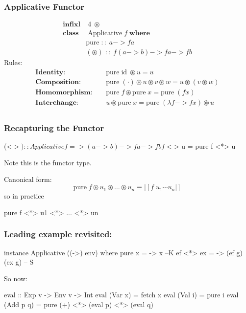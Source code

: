 \documentclass[18pt]{beamer}
\begin{document}
\begin{frame}[fragile] \frametitle{Applicative Functor}

\begin{align*}
  \mathbf{infixl} & \; 4 \; \circledast\\
  \mathbf{class} & \; \mathrm{Applicative} \; f \; \mathbf{where}\\
  \quad & \mathrm{pure} \; :: \; a -> f a\\
  \quad & (\circledast) \; :: \; f (a -> b) -> f a -> f b
\end{align*}
Rules:
\begin{align*}
  \mathbf{Identity:} \quad & \mathrm{pure} \; \mathrm{id} \;
  \circledast u = u\\
  \mathbf{Composition:} \quad & \mathrm{pure} \; (\cdot) \circledast u
  \circledast v \circledast w = u \circledast (v \circledast w)\\
  \mathbf{Homomorphism:} \quad & \mathrm{pure} \; f \circledast
  \mathrm{pure} \; x = \mathrm{pure} \; (f x)\\
  \mathbf{Interchange:} \quad & u \circledast \mathrm{pure} \; x = \mathrm{pure} \;
  (\lambda f -> f x) \circledast u\\
\end{align*}
\end{frame}

\begin{frame}[fragile] \frametitle{Recapturing the Functor}
  \begin{code}
    (<$>) :: Applicative f =>
          (a -> b) -> f a -> f b
    f <$> u = pure f <*> u
  \end{code}
  Note this is the functor type.
\end{frame}
\begin{frame}[fragile]
Canonical form:\\
\begin{equation*}
\mathrm{pure}\; f \circledast u_1 \circledast \ldots \circledast u_n \equiv |[f
\; u_1 \dotsb u_n|]
\end{equation*}
so in practice\\
\begin{code}
pure f <*> u1 <*> ... <*> un
\end{code}
\end{frame}

\begin{frame}[fragile] \frametitle{Leading example revisited:}
\begin{code}
instance Applicative ((->) env) where
  pure x = \g -> x --K
  ef <*> ex = \g -> (ef g)(ex g) -- S
\end{code}
So now:\\
\begin{code}
eval :: Exp v -> Env v -> Int
eval (Var x) = fetch x
eval (Val i) = pure i
eval (Add p q) =
  pure (+) <*>  (eval p) <*> (eval q)
\end{code}
\end{frame}
\end{document}
